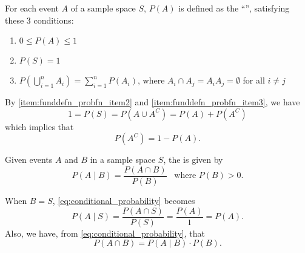 \documentclass[notoc,notitlepage]{tufte-book}
\begin{document}
\begin{defn}
\label{defn:fundamental_definition_of_a_probability_function}
  For each event $A$ of a sample space $S$, $P(A)$ is defined as the ``'', satisfying these 3 conditions:
  \begin{enumerate}
    \item $0 \leq P(A) \leq 1$
    \item $P(S) = 1$  \label{item:funddefn_probfn_item2}
    \item $P\left( \bigcup\limits_{i = 1}^{n} A_i \right) = \sum\limits_{i=1}^{n} P(A_i)$, where $A_i \cap A_j = A_i A_j = \emptyset$ for all $i \neq j$  \label{item:funddefn_probfn_item3}
  \end{enumerate}
\end{defn}

\begin{note}
  By \cref{item:funddefn_probfn_item2} and \cref{item:funddefn_probfn_item3}, we have
  \begin{equation*}
    1 = P(S) = P(A \cup A^C) = P(A) + P(A^C)
  \end{equation*}
  which implies that
  \begin{equation*}
    P(A^C) = 1 - P(A).
  \end{equation*}
\end{note}

\begin{defn}
\label{defn:conditional_probability}
  Given events $A$ and $B$ in a sample space $S$, the  is given by
  \begin{equation}\label{eq:conditional_probability}
    P(A \mid B) = \frac{P(A \cap B)}{P(B)} \enspace \text{ where } P(B) > 0.
  \end{equation}
\end{defn}

\begin{note}
  When $B = S$, \cref{eq:conditional_probability} becomes
  \begin{equation*}
    P(A \mid S) = \frac{P(A \cap S)}{P(S)} = \frac{P(A)}{1} = P(A).
  \end{equation*}
  Also, we have, from \cref{eq:conditional_probability}, that
  \begin{equation*}
    P(A \cap B) = P(A \mid B) \cdot P(B).
  \end{equation*}
\end{note}
\end{document}
